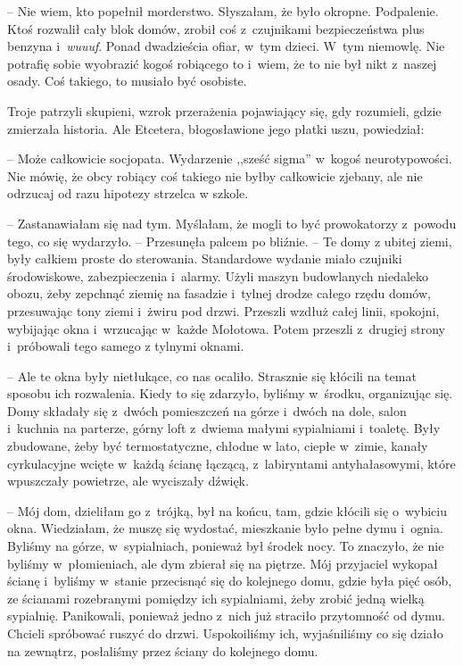 \documentclass[oneside,polish,11pt,sfheadings]{mwbk}
\begin{document}
-- Nie wiem, kto popełnił morderstwo. Słyszałam, że było okropne.
Podpalenie. Ktoś rozwalił cały blok domów, zrobił coś z~czujnikami
bezpieczeństwa plus benzyna i~\textit{wuuuf}. Ponad dwadzieścia ofiar, w~tym dzieci. W~tym niemowlę. Nie potrafię sobie wyobrazić kogoś robiącego
to i~wiem, że to nie był nikt z~naszej osady. Coś takiego, to musiało
być osobiste.

Troje patrzyli skupieni, wzrok przerażenia pojawiający się, gdy
rozumieli, gdzie zmierzała historia. Ale Etcetera, błogosławione jego
płatki uszu, powiedział: 

-- Może całkowicie socjopata. Wydarzenie ,,sześć
sigma'' w~kogoś neurotypowości. Nie mówię, że obcy robiący coś takiego
nie byłby całkowicie zjebany, ale nie odrzucaj od razu hipotezy strzelca
w szkole.

-- Zastanawiałam się nad tym. Myślałam, że mogli to być prowokatorzy z~powodu tego, co się wydarzyło. -- Przesunęła palcem po bliźnie. -- Te domy
z ubitej ziemi, były całkiem proste do sterowania. Standardowe wydanie
miało czujniki środowiskowe, zabezpieczenia i~alarmy. Użyli maszyn
budowlanych niedaleko obozu, żeby zepchnąć ziemię na fasadzie i~tylnej
drodze całego rzędu domów, przesuwając tony ziemi i~żwiru pod drzwi.
Przeszli wzdłuż całej linii, spokojni, wybijając okna i~wrzucając w~każde Mołotowa. Potem przeszli z~drugiej strony i~próbowali tego samego
z tylnymi oknami.

-- Ale te okna były nietłukące, co nas ocaliło. Strasznie się kłócili na
temat sposobu ich rozwalenia. Kiedy to się zdarzyło, byliśmy w~środku,
organizując się. Domy składały się z~dwóch pomieszczeń na górze i~dwóch
na dole, salon i~kuchnia na parterze, górny loft z~dwiema małymi
sypialniami i~toaletę. Były zbudowane, żeby być termostatyczne, chłodne
w lato, ciepłe w~zimie, kanały cyrkulacyjne wcięte w~każdą ścianę
łączącą, z~labiryntami antyhałasowymi, które wpuszczały powietrze, ale
wyciszały dźwięk.

-- Mój dom, dzieliłam go z~trójką, był na końcu, tam, gdzie kłócili się o~wybiciu okna. Wiedziałam, że muszę się wydostać, mieszkanie było pełne
dymu i~ognia. Byliśmy na górze, w~sypialniach, ponieważ był środek nocy.
To znaczyło, że nie byliśmy w~płomieniach, ale dym zbierał się na
piętrze. Mój przyjaciel wykopał ścianę i~byliśmy w~stanie przecisnąć się
do kolejnego domu, gdzie była pięć osób, ze ścianami rozebranymi
pomiędzy ich sypialniami, żeby zrobić jedną wielką sypialnię.
Panikowali, ponieważ jedno z~nich już straciło przytomność od dymu.
Chcieli spróbować ruszyć do drzwi. Uspokoiliśmy ich, wyjaśniliśmy co się
działo na zewnątrz, posłaliśmy przez ściany do kolejnego domu.
\end{document}
